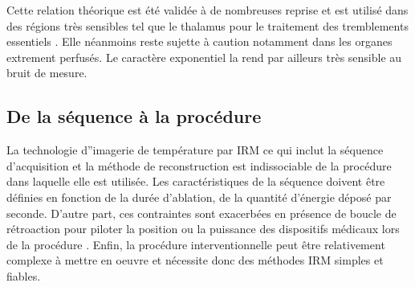 
Cette relation théorique est été validée à de nombreuses reprise et est utilisé dans des régions très sensibles tel que le thalamus pour le traitement des tremblements essentiels \cite{huang2018predicting}. Elle néanmoins reste sujette à caution \cite{o2012estimation} notamment dans les organes extrement perfusés. Le caractère exponentiel la rend par ailleurs très sensible au bruit de mesure.  

\subsection{De la séquence à la procédure}

La technologie d''imagerie de température par IRM ce qui inclut la séquence d'acquisition et la méthode de reconstruction est indissociable de la procédure dans laquelle elle est utilisée. Les caractéristiques de la séquence doivent être définies en fonction de la durée d'ablation, de la quantité d'énergie déposé par seconde. D'autre part, ces contraintes sont exacerbées en présence de boucle de rétroaction pour piloter la position ou la puissance des dispositifs médicaux lors de la procédure \cite{bour2018real,desclides2023real, ozenne2016automatic}. Enfin, la procédure interventionnelle peut être relativement complexe à mettre en oeuvre et nécessite donc des méthodes IRM simples et fiables.\\
